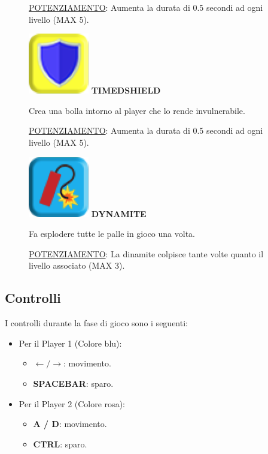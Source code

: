 \documentclass[a4paper,12pt]{report}
\begin{document}
\begin{itemize}
\begin{figure}[H]
 			\underline{POTENZIAMENTO}: Aumenta la durata di 0.5 secondi ad ogni livello (MAX 5).
	\end{figure}
	\begin{figure}[H]
			\item
			\includegraphics[width=0.05\linewidth]{img/5}
			\label{img:shield}
			\textbf{TIMEDSHIELD}

			Crea una bolla intorno al player che lo rende invulnerabile.

 			\underline{POTENZIAMENTO}: Aumenta la durata di 0.5 secondi ad ogni livello (MAX 5).
	\end{figure}
	\begin{figure}[H]
			\item
			\includegraphics[width=0.05\linewidth]{img/6}
			\label{img:dynamite}
			\textbf{DYNAMITE}

			Fa esplodere tutte le palle in gioco una volta.

 			\underline{POTENZIAMENTO}: La dinamite colpisce tante volte quanto il livello associato (MAX 3).
	\end{figure}
\end{itemize}

\subsection*{Controlli}

I controlli durante la fase di gioco sono i seguenti:

\begin{itemize}
	\item Per il Player 1 (Colore blu):
	\begin{itemize}
		\item \textbf{$\leftarrow / \rightarrow$}: movimento.
		\item \textbf{SPACEBAR}: sparo.
	\end{itemize}
	\item Per il Player 2 (Colore rosa):
		\begin{itemize}
		\item \textbf{A / D}: movimento.
		\item \textbf{CTRL}: sparo.
	\end{itemize}
\end{itemize}
\end{document}
